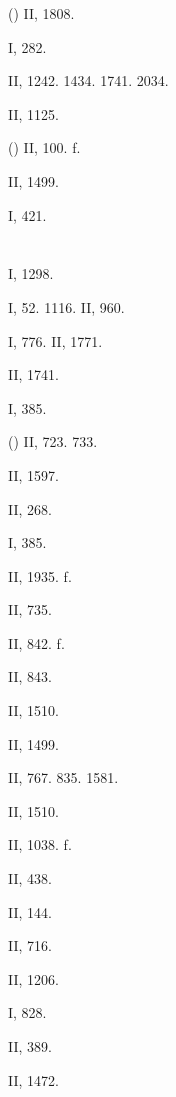  () II, 1808.

 I, 282.

 II, 1242. 1434. 1741. 2034.

 II, 1125.

 () II, 100. f.

 II, 1499.

 I, 421.

\section{}

 I, 1298.

 I, 52. 1116. II, 960.

 I, 776. II, 1771.

 II, 1741.

 I, 385.

 () II, 723. 733.

 II, 1597.

 II, 268.

 I, 385.

 II, 1935. f.

 II, 735.

 II, 842. f.

 II, 843.

 II, 1510.

 II, 1499.

 II, 767. 835. 1581.

 II, 1510.

 II, 1038. f.

 II, 438.

 II, 144.

 II, 716.

 II, 1206.

 I, 828.

 II, 389.

 II, 1472.

